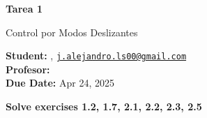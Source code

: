  





\begin{Large}
	\textbf{\textbf{Tarea 1}}

	Control por Modos Deslizantes
\end{Large}

\vspace{1ex}

\textbf{Student:} , \href{mailto:j.alejandro.ls00@gmail.com}{\texttt{j.alejandro.ls00@gmail.com}}\\
\textbf{Profesor:}  \\
\textbf{Due Date:} Apr 24, 2025 \\

\vspace{2ex}

\textbf{Solve exercises 1.2, 1.7, 2.1, 2.2, 2.3, 2.5}


\newpage

\newpage

\newpage

\newpage

\newpage

\newpage


% 
% 

